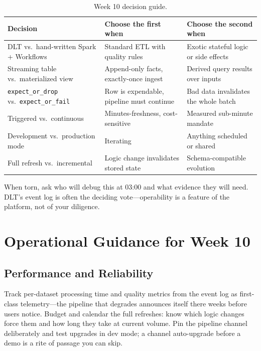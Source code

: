 \begin{table}[H]
\centering
\small
\begin{tabular}{@{}p{3.4cm}p{4.4cm}p{4.6cm}@{}}
\toprule
\textbf{Decision} & \textbf{Choose the first when} & \textbf{Choose the second when} \\
\midrule
DLT vs.\ hand-written Spark + Workflows & Standard ETL with quality rules & Exotic stateful logic or side effects \\
Streaming table vs.\ materialized view & Append-only facts, exactly-once ingest & Derived query results over inputs \\
\texttt{expect\_or\_drop} vs.\ \texttt{expect\_or\_fail} & Row is expendable, pipeline must continue & Bad data invalidates the whole batch \\
Triggered vs.\ continuous & Minutes-freshness, cost-sensitive & Measured sub-minute mandate \\
Development vs.\ production mode & Iterating & Anything scheduled or shared \\
Full refresh vs.\ incremental & Logic change invalidates stored state & Schema-compatible evolution \\
\bottomrule
\end{tabular}
\caption{Week 10 decision guide.}
\label{tab:ch10-decisions}
\end{table}

When torn, ask who will debug this at 03:00 and what evidence they will need. DLT's event log is often the deciding vote---operability is a feature of the platform, not of your diligence.

\section{Operational Guidance for Week 10}
%
\subsection{Performance and Reliability}
Track per-dataset processing time and quality metrics from the event log as first-class telemetry---the pipeline that degrades announces itself there weeks before users notice. Budget and calendar the full refreshes: know which logic changes force them and how long they take at current volume. Pin the pipeline channel deliberately and test upgrades in dev mode; a channel auto-upgrade before a demo is a rite of passage you can skip.

